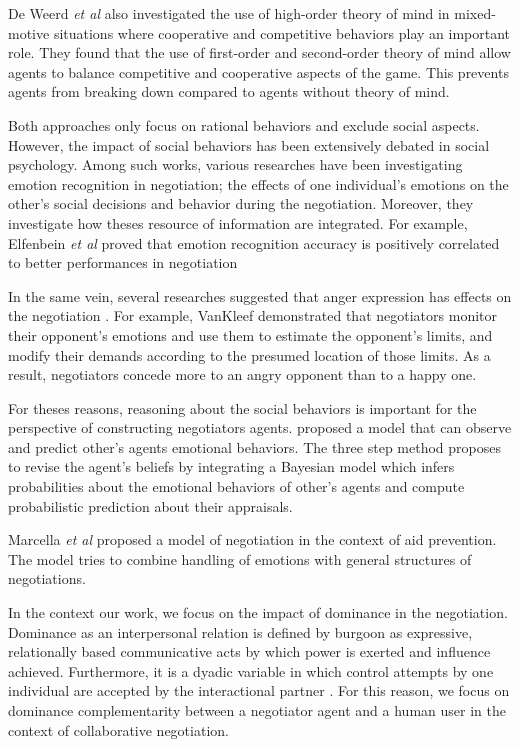 \documentclass[conference, letterpaper]{IEEEtran}
\begin{document}
	De Weerd \textit{et al} \cite{de2013higher} also investigated the use of high-order theory of mind in mixed-motive situations where cooperative and competitive behaviors play an important role. They found that the use of first-order and second-order theory of mind allow agents to balance competitive and cooperative	aspects of the game. This prevents agents from breaking down compared to  agents without theory of mind.
	
	
	Both approaches only focus on rational behaviors and exclude social aspects. However, the impact of social behaviors has been extensively debated in social psychology. Among such works, various researches have been investigating emotion recognition in negotiation; the effects of one individual's	emotions on the other's social decisions and behavior during the negotiation. Moreover, they investigate how theses resource of information are integrated.
	For example, Elfenbein\textit{ et al} \cite{elfenbein2007reading} proved that  emotion recognition accuracy is positively correlated to  better performances in negotiation
	
	In the same vein, several researches suggested that anger expression has effects on the negotiation \cite{sinaceur2006get,van2010interpersonal,ferguson2004social}. For example, VanKleef \cite{van2004interpersonal} demonstrated that negotiators monitor their opponent's emotions and use them to estimate the opponent's limits, and modify their demands according to the presumed location of those limits. As a result, negotiators concede more to an angry opponent than to a happy one. 
	
	
	For theses reasons, reasoning about the social behaviors is important for the perspective of constructing negotiators agents. \cite{alfonso2015emotional} proposed a model that can observe and predict other's agents emotional behaviors. The three step method proposes to revise the agent's  beliefs by integrating a Bayesian model which infers probabilities about the emotional behaviors of other's agents and compute probabilistic prediction about their appraisals.
	
	Marcella \textit{et al} \cite{klatt2011negotiations} proposed a model of negotiation in the context of aid prevention. The model tries to combine handling of emotions with general structures of negotiations. 
	
	In the context our work, we focus on the impact of dominance in the negotiation. Dominance as an interpersonal relation is defined by burgoon \cite{burgoon1998nature} as expressive, relationally based communicative acts by which power is exerted and influence achieved. Furthermore, it is a dyadic variable in which control attempts by one individual are accepted by the
	interactional partner \cite{dunbar2005perceptions}. For this reason, we focus on dominance complementarity between a negotiator agent and a human user in the context of collaborative negotiation. 
	
\end{document}
